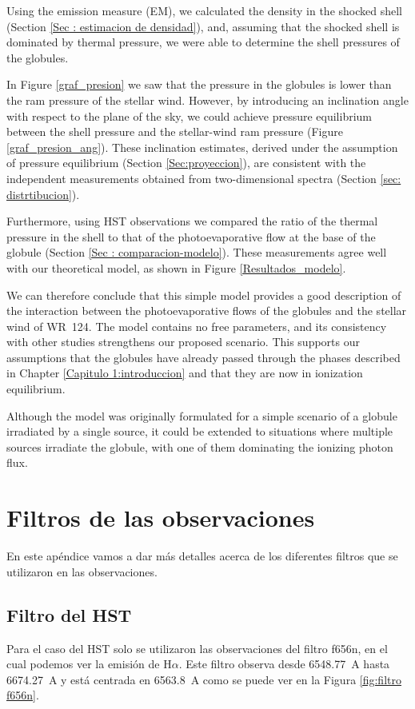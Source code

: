 \documentclass{book}
\begin{document}
Using the emission measure (EM), we calculated the density in the
shocked shell (Section \ref{Sec : estimacion de densidad}), and,
assuming that the shocked shell is dominated by thermal pressure, we
were able to determine the shell pressures of the globules.

In Figure \ref{graf_presion} we saw that the pressure in the globules
is lower than the ram pressure of the stellar wind. However, by
introducing an inclination angle with respect to the plane of the sky,
we could achieve pressure equilibrium between the shell pressure and
the stellar-wind ram pressure (Figure \ref{graf_presion_ang}). These
inclination estimates, derived under the assumption of pressure
equilibrium (Section \ref{Sec:proyeccion}), are consistent with the
independent measurements obtained from two-dimensional spectra
(Section \ref{sec: distrtibucion}).

Furthermore, using HST observations we compared the ratio of the
thermal pressure in the shell to that of the photoevaporative flow at
the base of the globule (Section \ref{Sec : comparacion-modelo}).
These measurements agree well with our theoretical model, as shown in
Figure \ref{Resultados_modelo}.

We can therefore conclude that this simple model provides a good
description of the interaction between the photoevaporative flows of
the globules and the stellar wind of WR~124. The model contains no
free parameters, and its consistency with other studies strengthens
our proposed scenario. This supports our assumptions that the globules
have already passed through the phases described in Chapter
\ref{Capitulo 1:introduccion} and that they are now in ionization
equilibrium.

Although the model was originally formulated for a simple scenario of
a globule irradiated by a single source, it could be extended to
situations where multiple sources irradiate the globule, with one of
them dominating the ionizing photon flux.
\appendix

\chapter{Filtros de las observaciones}\label{App: Filtros}

En este apéndice vamos a dar más detalles acerca de los diferentes
filtros que se utilizaron en las observaciones.
\section{Filtro del HST}
Para el caso del HST solo se utilizaron las observaciones del filtro
f656n, en el cual podemos ver la emisión de H$\alpha$. Este filtro observa
desde \SI{6548.77}{A} hasta \SI{6674.27}{A} y está centrada en
\SI{6563.8}{A} como se puede ver en la Figura \ref{fig:filtro f656n}.
\end{document}
